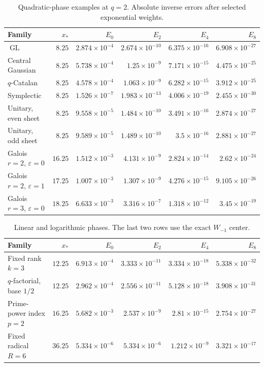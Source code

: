 \documentclass[11pt,openany]{book}
\numberwithin{equation}{chapter}
\theoremstyle{plain}
\theoremstyle{definition}
\theoremstyle{remark}
\newcommand{\eps}{\varepsilon}
\newcommand{\GL}{\operatorname{GL}}\newcommand{\Sp}{\operatorname{Sp}}
\begin{document}
\begin{table}[htbp]
\centering\small
\setlength{\tabcolsep}{4pt}
\begin{tabular}{@{}lrrrrr@{}}
\toprule
Family & $x_*$ & $E_0$ & $E_2$ & $E_4$ & $E_8$\\
\midrule
$\GL$ & $8.25$ & $2.874\times10^{-4}$ & $2.674\times10^{-10}$ & $6.375\times10^{-16}$ & $6.908\times10^{-27}$ \\
Central Gaussian & $8.25$ & $5.738\times10^{-4}$ & $1.25\times10^{-9}$ & $7.171\times10^{-15}$ & $4.475\times10^{-25}$ \\
$q$-Catalan & $8.25$ & $4.578\times10^{-4}$ & $1.063\times10^{-9}$ & $6.282\times10^{-15}$ & $3.912\times10^{-25}$ \\
Symplectic & $8.25$ & $1.526\times10^{-7}$ & $1.983\times10^{-13}$ & $4.006\times10^{-19}$ & $2.455\times10^{-30}$ \\
Unitary, even sheet & $8.25$ & $9.558\times10^{-5}$ & $1.484\times10^{-10}$ & $3.491\times10^{-16}$ & $2.874\times10^{-27}$ \\
Unitary, odd sheet & $8.25$ & $9.589\times10^{-5}$ & $1.489\times10^{-10}$ & $3.5\times10^{-16}$ & $2.881\times10^{-27}$ \\
Galois $r=2$, $\eps=0$ & $16.25$ & $1.512\times10^{-3}$ & $4.131\times10^{-9}$ & $2.824\times10^{-14}$ & $2.62\times10^{-24}$ \\
Galois $r=2$, $\eps=1$ & $17.25$ & $1.007\times10^{-3}$ & $1.307\times10^{-9}$ & $4.276\times10^{-15}$ & $9.105\times10^{-26}$ \\
Galois $r=3$, $\eps=0$ & $18.25$ & $6.633\times10^{-3}$ & $3.316\times10^{-7}$ & $1.318\times10^{-12}$ & $3.45\times10^{-19}$ \\
\bottomrule
\end{tabular}
\caption{Quadratic-phase examples at $q=2$. Absolute inverse errors after selected exponential weights.}
\end{table}

\begin{table}[htbp]
\centering\small
\setlength{\tabcolsep}{4pt}
\begin{tabular}{@{}lrrrrr@{}}
\toprule
Family & $x_*$ & $E_0$ & $E_2$ & $E_4$ & $E_8$\\
\midrule
Fixed rank $k=3$ & $12.25$ & $6.913\times10^{-4}$ & $3.333\times10^{-11}$ & $3.334\times10^{-18}$ & $5.338\times10^{-32}$ \\
$q$-factorial, base $1/2$ & $12.25$ & $2.962\times10^{-4}$ & $2.556\times10^{-11}$ & $5.128\times10^{-18}$ & $3.908\times10^{-31}$ \\
Prime-power index $p=2$ & $16.25$ & $5.682\times10^{-3}$ & $2.537\times10^{-9}$ & $2.81\times10^{-15}$ & $2.754\times10^{-27}$ \\
Fixed radical $R=6$ & $36.25$ & $5.334\times10^{-6}$ & $5.334\times10^{-6}$ & $1.212\times10^{-9}$ & $3.321\times10^{-17}$ \\
\bottomrule
\end{tabular}
\caption{Linear and logarithmic phases. The last two rows use the exact $W_{-1}$ center.}
\end{table}
\end{document}
